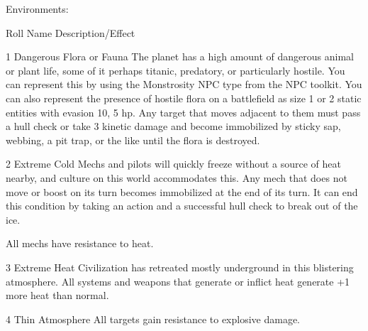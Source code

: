                                               Environments:
 

 Roll    Name                                Description/Effect 

 1       Dangerous Flora or Fauna            The planet has a high amount of dangerous animal or  
                                             plant life, some of it perhaps titanic, predatory, or  
                                             particularly hostile. You can represent this by using the  
                                             Monstrosity NPC type from the NPC toolkit. You can  
                                             also represent the presence of hostile flora on a  
                                             battlefield as size 1 or 2 static entities with evasion 10,  
                                             5 hp. Any target that moves adjacent to them must  
                                             pass a hull check or take 3 kinetic damage and become  
                                             immobilized by sticky sap, webbing, a pit trap, or the  
                                             like until the flora is destroyed. 

 2       Extreme Cold                        Mechs and pilots will quickly freeze without a source of  
                                             heat nearby, and culture on this world accommodates  
                                             this. Any mech that does not move or boost on its turn  
                                             becomes immobilized at the end of its turn. It can end  
                                             this condition by taking an action and a successful hull  
                                             check to break out of the ice.
 
                                             All mechs have resistance to heat. 

 3       Extreme Heat                        Civilization has retreated mostly underground in this  
                                             blistering atmosphere. All systems and weapons that  
                                             generate or inflict heat generate +1 more heat than  
                                             normal. 

 4       Thin Atmosphere                     All targets gain resistance to explosive damage. 

                                                                                                          


